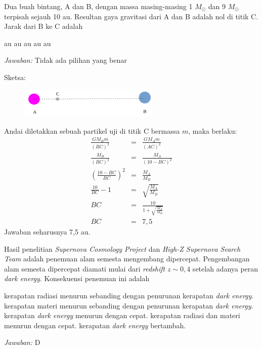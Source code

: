 \documentclass[11pt,fleqn]{exam}
\begin{document}
\begin{questions}
\question Dua buah bintang, A dan B, dengan massa masing-masing 1 $M_{\odot}$ dan 9 $M_{\odot}$ terpisah sejauh 10 au. Resultan gaya gravitasi dari A dan B adalah nol di titik C. Jarak dari B ke C adalah
\begin{choices}
 au
 au
 au
 au
 au
\end{choices}

\textit{Jawaban: } Tidak ada pilihan yang benar

Sketsa:
\begin{figure}[h!]
\centering
\includegraphics[width=0.6\textwidth]{nomor9.png}
\end{figure}

Andai diletakkan sebuah partikel uji di titik C bermassa $m$, maka berlaku:\\
\begin{eqnarray*}
\frac{GM_Bm}{(BC)^2}&=&\frac{GM_Am}{(AC)^2}\\
\frac{M_B}{(BC)^2}&=&\frac{M_A}{(10-BC)^2}\\
\left(\frac{10-BC}{BC}\right)^2&=&\frac{M_A}{M_B}\\
\frac{10}{BC}-1&=&\sqrt{\frac{M_A}{M_B}}\\
BC &=& \frac{10}{1 + \sqrt{\frac{M_A}{M_B}}}\\
BC &=& 7,5
\end{eqnarray*}
Jawaban seharusnya 7,5 au.




\question Hasil penelitian \textit{Supernova Cosmology Project} dan \textit{High-Z Supernova Search Team} adalah penemuan alam semesta mengembang dipercepat. Pengembangan alam semesta dipercepat diamati mulai dari \textit{redshift} $z\sim0,4$ setelah adanya peran \textit{dark energy}. Konsekuensi penemuan ini adalah
\begin{choices}
\choice kerapatan radiasi menurun sebanding dengan penurunan kerapatan \textit{dark energy}.
\choice kerapatan materi menurun sebanding dengan penurunan kerapatan \textit{dark energy}.
\choice kerapatan \textit{dark energy} menurun dengan cepat.
\choice kerapatan radiasi dan materi menurun dengan cepat.
\choice kerapatan \textit{dark energy} bertambah.
\end{choices}

\textit{Jawaban:} D


\end{questions}
\end{document}
